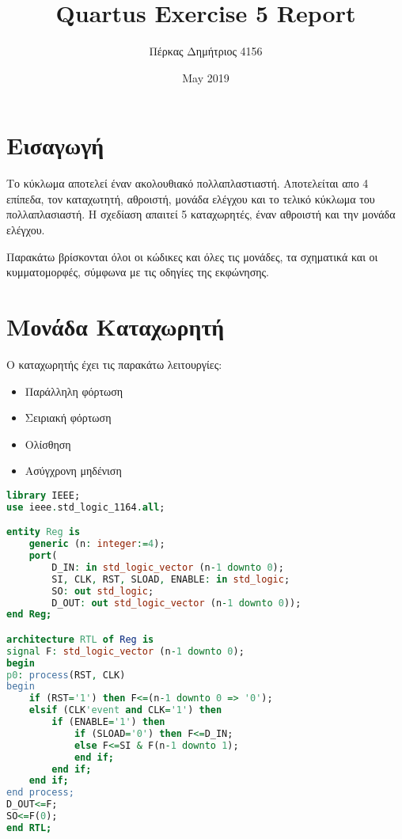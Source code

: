 \documentclass{article}
\title{\foreignlanguage{english}{Quartus Exercise 5 Report}}
\author{Πέρκας Δημήτριος 4156}
\date{\foreignlanguage{english}{May 2019}}
\begin{document}
\maketitle
\thispagestyle{empty}

\clearpage
\thispagestyle{empty}
\tableofcontents
\listoffigures
\clearpage
{}

\section{Εισαγωγή}

Το κύκλωμα αποτελεί έναν ακολουθιακό πολλαπλαστιαστή. Αποτελείται απο 4 επίπεδα, τον καταχωτητή, αθροιστή, μονάδα ελέγχου και το τελικό κύκλωμα του πολλαπλασιαστή. Η σχεδίαση απαιτεί 5 καταχωρητές, έναν αθροιστή και την μονάδα ελέγχου.

Παρακάτω βρίσκονται όλοι οι κώδικες και όλες τις μονάδες, τα σχηματικά και οι κυμματομορφές, σύμφωνα με τις οδηγίες της εκφώνησης.


\section{Μονάδα Καταχωρητή}

Ο καταχωρητής έχει τις παρακάτω λειτουργίες:
\begin{itemize}
    \item Παράλληλη φόρτωση
    \item Σειριακή φόρτωση
    \item Ολίσθηση
    \item Ασύγχρονη μηδένιση
\end{itemize}


\begin{otherlanguage}{english}
\begin{lstlisting}[language=VHDL, caption= Register VHDL Code]
library IEEE;
use ieee.std_logic_1164.all;

entity Reg is
	generic (n: integer:=4);
	port(
		D_IN: in std_logic_vector (n-1 downto 0);
		SI, CLK, RST, SLOAD, ENABLE: in std_logic;
		SO: out std_logic;
		D_OUT: out std_logic_vector (n-1 downto 0));
end Reg;

architecture RTL of Reg is
signal F: std_logic_vector (n-1 downto 0);
begin
p0: process(RST, CLK)
begin
	if (RST='1') then F<=(n-1 downto 0 => '0');
	elsif (CLK'event and CLK='1') then
		if (ENABLE='1') then
			if (SLOAD='0') then F<=D_IN;
			else F<=SI & F(n-1 downto 1);
			end if;
		end if;
	end if;
end process;
D_OUT<=F;
SO<=F(0);
end RTL;
\end{lstlisting}
\end{otherlanguage}
\end{document}
